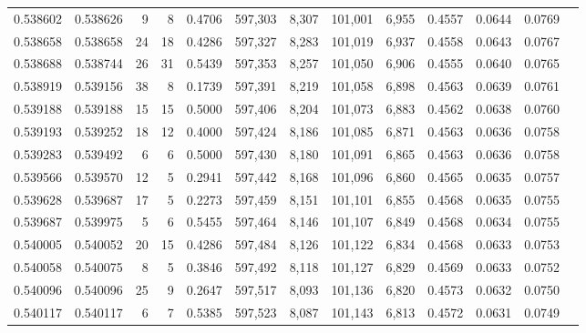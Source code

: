 \begin{tabular}{rrrrrrrrrrrrr}
0.538602 & 0.538626 &     9 &     8 &                                     0.4706 & 597,303 &   8,307 & 101,001 &   6,955 & 0.4557 & 0.0644 & 0.0769 \\
0.538658 & 0.538658 &    24 &    18 &                                     0.4286 & 597,327 &   8,283 & 101,019 &   6,937 & 0.4558 & 0.0643 & 0.0767 \\
0.538688 & 0.538744 &    26 &    31 &                                     0.5439 & 597,353 &   8,257 & 101,050 &   6,906 & 0.4555 & 0.0640 & 0.0765 \\
0.538919 & 0.539156 &    38 &     8 &                                     0.1739 & 597,391 &   8,219 & 101,058 &   6,898 & 0.4563 & 0.0639 & 0.0761 \\
0.539188 & 0.539188 &    15 &    15 &                                     0.5000 & 597,406 &   8,204 & 101,073 &   6,883 & 0.4562 & 0.0638 & 0.0760 \\
0.539193 & 0.539252 &    18 &    12 &                                     0.4000 & 597,424 &   8,186 & 101,085 &   6,871 & 0.4563 & 0.0636 & 0.0758 \\
0.539283 & 0.539492 &     6 &     6 &                                     0.5000 & 597,430 &   8,180 & 101,091 &   6,865 & 0.4563 & 0.0636 & 0.0758 \\
0.539566 & 0.539570 &    12 &     5 &                                     0.2941 & 597,442 &   8,168 & 101,096 &   6,860 & 0.4565 & 0.0635 & 0.0757 \\
0.539628 & 0.539687 &    17 &     5 &                                     0.2273 & 597,459 &   8,151 & 101,101 &   6,855 & 0.4568 & 0.0635 & 0.0755 \\
0.539687 & 0.539975 &     5 &     6 &                                     0.5455 & 597,464 &   8,146 & 101,107 &   6,849 & 0.4568 & 0.0634 & 0.0755 \\
0.540005 & 0.540052 &    20 &    15 &                                     0.4286 & 597,484 &   8,126 & 101,122 &   6,834 & 0.4568 & 0.0633 & 0.0753 \\
0.540058 & 0.540075 &     8 &     5 &                                     0.3846 & 597,492 &   8,118 & 101,127 &   6,829 & 0.4569 & 0.0633 & 0.0752 \\
0.540096 & 0.540096 &    25 &     9 &                                     0.2647 & 597,517 &   8,093 & 101,136 &   6,820 & 0.4573 & 0.0632 & 0.0750 \\
0.540117 & 0.540117 &     6 &     7 &                                     0.5385 & 597,523 &   8,087 & 101,143 &   6,813 & 0.4572 & 0.0631 & 0.0749 \\

\end{tabular}
